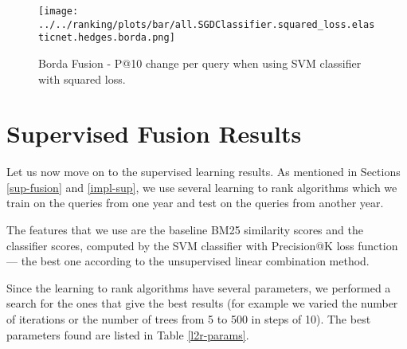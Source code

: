 \begin{figure}
\centerline{
  \texttt{[image: ../../ranking/plots/bar/all.SGDClassifier.squared\_loss.elasticnet.hedges.borda.png]}
  }
  \caption{Borda Fusion - P@10 change per query when using SVM classifier with squared loss.}
  \label{borda-query}
\end{figure}


\section{Supervised Fusion Results}
Let us now move on to the supervised learning results. As mentioned in Sections \ref{sup-fusion} and \ref{impl-sup}, we use several
learning to rank algorithms which we train on the queries from one year and test on the queries from another year.

The features that we use are the baseline BM25 similarity scores and the classifier scores, computed by the SVM
classifier with Precision@K loss function --- the best one according to the unsupervised linear combination method.

Since the learning to rank algorithms have several parameters, we performed a search for the ones that give the best
results (for example we varied the number of iterations or the number of trees from 5 to 500 in steps of 10).
The best parameters found are listed in Table \ref{l2r-params}.

\begin{table}[h!]
\centering
\caption{Best parameters found for the learning-to-rank algorithms.}
\label{l2r-params}
\end{table}

